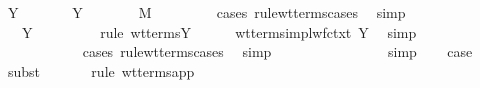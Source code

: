\begin{isabellebody}
\ Y\ \isamarkupfalse%
\ {\isasympi}\ \ {}{\isacharcolon}\ {\isachardoublequoteopen}{\isasymGamma}\ {\isasymturnstile}\ {\isacharparenleft}Y\ {\isasymtau}{\isacharparenright}\ {\isacharcolon}\ {\isasympi}\ {\isasymrightarrow}\ {\isasymsigma}{\isachardoublequoteclose}\ {\isachardoublequoteopen}{\isasymGamma}\ {\isasymturnstile}\ M\ {\isacharcolon}\ {\isasympi}{\isachardoublequoteclose}\ \isanewline
\ \ \ \ \isamarkupfalse%
\ {\isacharparenleft}cases\ rule{\isacharcolon}wt{\isacharunderscore}terms{\isachardot}cases{\isacharparenright}\ \isamarkupfalse%
\ simp\isanewline
\ \ \isamarkupfalse%
\ {\isachardoublequoteopen}{\isasymGamma}\ {\isasymturnstile}\ {\isacharparenleft}Y\ {\isasymtau}{\isacharparenright}\ {\isacharcolon}\ {\isacharparenleft}{\isasymtau}\ {\isasymrightarrow}\ {\isasymtau}{\isacharparenright}\ {\isasymrightarrow}\ {\isasymtau}{\isachardoublequoteclose}\ \isamarkupfalse%
\ {\isacharparenleft}rule\ wt{\isacharunderscore}terms{\isachardot}Y{\isacharparenright}\isanewline
\ \ \ \ \isamarkupfalse%
\ wt{\isacharunderscore}terms{\isacharunderscore}impl{\isacharunderscore}wf{\isacharunderscore}ctxt\ Y\ \isamarkupfalse%
\ simp\isanewline
\ \ \isamarkupfalse%
\ {}{\isacharparenleft}{}{\isacharparenright}\ \isamarkupfalse%
\ {\isachardoublequoteopen}{\isasympi}\ {\isasymrightarrow}\ {\isasymsigma}\ {\isacharequal}\ {\isacharparenleft}{\isasymtau}\ {\isasymrightarrow}\ {\isasymtau}{\isacharparenright}\ {\isasymrightarrow}\ {\isasymtau}{\isachardoublequoteclose}\ \isamarkupfalse%
\ {\isacharparenleft}cases\ rule{\isacharcolon}wt{\isacharunderscore}terms{\isachardot}cases{\isacharparenright}\ \isamarkupfalse%
\ simp\isanewline
\ \ \isamarkupfalse%
\ \isamarkupfalse%
\ {}{\isacharcolon}\ {\isachardoublequoteopen}{\isasympi}\ {\isacharequal}\ {\isasymtau}\ {\isasymrightarrow}\ {\isasymtau}{\isachardoublequoteclose}\ {\isachardoublequoteopen}{\isasymsigma}\ {\isacharequal}\ {\isasymtau}{\isachardoublequoteclose}\ \isamarkupfalse%
\ simp{\isacharplus}\isanewline
\ \ \isamarkupfalse%
\ {\isacharquery}case\isanewline
\ \ \ \ \isamarkupfalse%
\ {\isacharparenleft}subst\ {}{\isacharparenright}\isanewline
\ \ \ \ \isamarkupfalse%
\ {\isacharparenleft}rule\ wt{\isacharunderscore}terms{\isachardot}app{\isacharparenright}\isanewline

\end{isabellebody}

